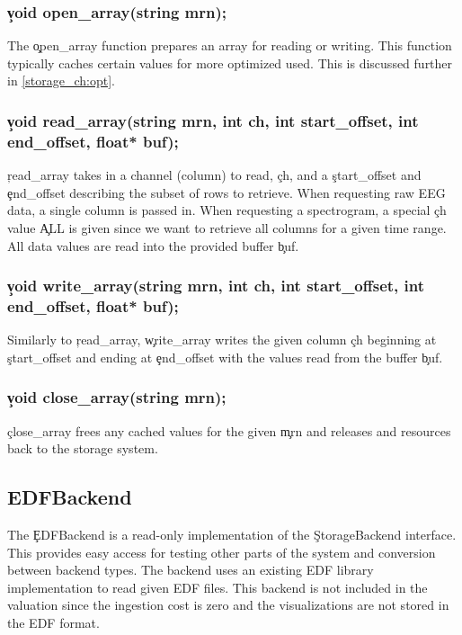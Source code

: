 \subsubsection{\c{void open\_array(string mrn);}}
The \c{open\_array} function prepares an array for reading or writing. This
function typically caches certain values for more optimized used. This is
discussed further in \ref{storage_ch:opt}.

\subsubsection{\c{void read\_array(string mrn, int ch, int start\_offset, int end\_offset, float* buf);}}
\c{read\_array} takes in a channel (column) to read, \c{ch}, and a
\c{start\_offset} and \c{end\_offset} describing the subset of rows to
retrieve.  When requesting raw EEG data, a single column is passed in. When
requesting a spectrogram, a special \c{ch} value \c{ALL} is given since we want
to retrieve all columns for a given time range. All data values are read into
the provided buffer \c{buf}.

\subsubsection{\c{void write\_array(string mrn, int ch, int start\_offset, int end\_offset, float* buf);}}
Similarly to \c{read\_array}, \c{write\_array} writes the given column \c{ch}
beginning at \c{start\_offset} and ending at \c{end\_offset} with the values
read from the buffer \c{buf}.

\subsubsection{\c{void close\_array(string mrn);}}
\c{close\_array} frees any cached values for the given \c{mrn} and releases
and resources back to the storage system.

\subsection{EDFBackend}

The \c{EDFBackend} is a read-only implementation of the \c{StorageBackend}
interface. This provides easy access for testing other parts of the system and
conversion between backend types. The backend uses an existing EDF library
implementation \cite{edflib} to read given EDF files. This backend is not
included in the valuation since the ingestion cost is zero and the
visualizations are not stored in the EDF format.

